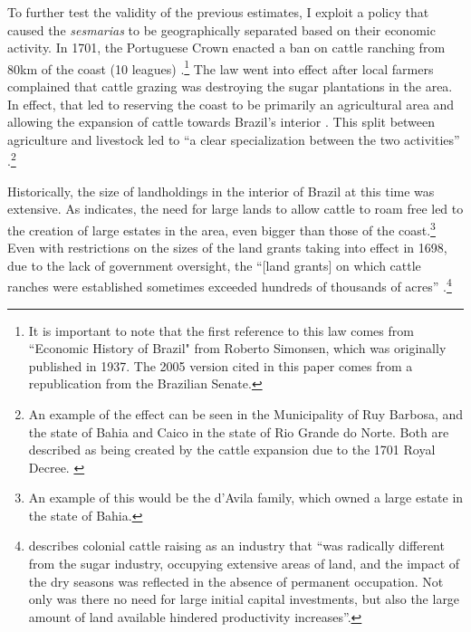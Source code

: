 \documentclass[11pt]{article}
\newcommand{\red}[1]{\textcolor{red}{#1}}
\begin{document}
To further test the validity of the previous estimates, I exploit a policy that caused the \textit{sesmarias} to be geographically separated based on their economic activity.
In 1701, the Portuguese Crown enacted a ban on cattle ranching from 80km of the coast (10 leagues) \parencites[p~.40]{Fausto2014-bh}[p~.198]{Simonsen2005-ps}[p~.460]{Bethell1984-of}.\footnote{It is important to note that the first reference to this law comes from ``Economic History of Brazil" from Roberto Simonsen, which was originally published in 1937. The 2005 version cited in this paper comes from a republication from the Brazilian Senate.} 
The law went into effect after local farmers complained that cattle grazing was destroying the sugar plantations in the area. 
In effect, that led to reserving the coast to be primarily an agricultural area and allowing the expansion of cattle towards Brazil's interior \parencite[p.~216]{Junior1968-iu}.
This split between agriculture and livestock led to ``a clear specialization between the two activities'' \parencite{Ribeiro2012-lb}.\footnote{An example of the effect can be seen in the Municipality of Ruy Barbosa, and the state of Bahia and Caico in the state of Rio Grande do Norte. 
Both are described as being created by the cattle expansion due to the 1701 Royal Decree. \parencite{UnknownUnknown-ro}}


Historically, the size of landholdings in the interior of Brazil at this time was extensive. 
As \textcite[p~.41]{Fausto2014-bh} indicates, the need for large lands to allow cattle to roam free led to the creation of large estates in the area, even bigger than those of the coast.\footnote{An example of this would be the d'Avila family, which owned a large estate in the state of Bahia.} %
Even with restrictions on the sizes of the land grants taking into effect in 1698, due to the lack of government oversight, the  ``[land grants] on which cattle ranches were established sometimes exceeded hundreds of thousands of acres'' \parencite{Bethell1984-of}.\footnote{\textcite[p.~117]{Bertola2017-hr} describes colonial cattle raising as an industry that ``was radically different from the sugar industry, occupying extensive areas of land, and  the impact of the dry seasons was reflected in the absence of permanent occupation.  Not only was there no need for large initial capital investments, but also the large  amount of land available hindered productivity increases''.}
\end{document}
